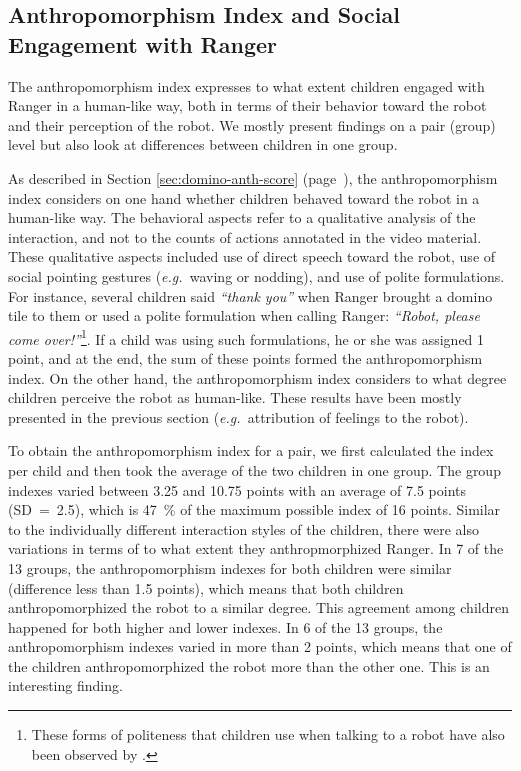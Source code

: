 \documentclass{sig-alternate}
\newcommand{\eg}{{\textit{e.g.~}}}
\begin{document}
\subsection{Anthropomorphism Index and Social Engagement with Ranger}

The anthropomorphism index expresses to what extent children engaged with Ranger
in a human-like way, both in terms of their behavior toward the robot and their
perception of the robot. We mostly present findings on a pair (group) level but
also look at differences between children in one group. 

As described in Section \ref{sec:domino-anth-score}
(page~\pageref{sec:domino-anth-score}), the anthropomorphism index considers on
one hand whether children behaved toward the robot in a human-like way. The
behavioral aspects refer to a qualitative analysis of the interaction, and not
to the counts of actions annotated in the video material. These qualitative
aspects included use of direct speech toward the robot, use of social pointing
gestures (\eg waving or nodding), and use of polite formulations. For instance,
several children said \textit{``thank you''} when Ranger brought a domino tile
to them or used a polite formulation when calling Ranger: \textit{``Robot,
please come over!''}\footnote{These forms of politeness that children use when
talking to a robot have also been observed by \cite{leite_long-term_2013}.}. If
a child was using such formulations, he or she was assigned 1 point, and at the
end, the sum of these points formed the anthropomorphism index. On the other
hand, the anthropomorphism index considers to what degree children perceive the
robot as human-like. These results have been mostly presented in the previous
section (\eg attribution of feelings to the robot). 

To obtain the anthropomorphism index for a pair, we first calculated the index
per child and then took the average of the two children in one group.  The group
indexes varied between 3.25 and 10.75 points with an average of 7.5 points
(SD~=~2.5), which is 47~\% of the maximum possible index of 16 points. Similar
to the individually different interaction styles of the children, there were
also variations in terms of to what extent they anthropmorphized Ranger. In 7 of
the 13 groups, the anthropomorphism indexes for both children were similar
(difference less than 1.5 points), which means that both children
anthropomorphized the robot to a similar degree. This agreement among children
happened for both higher and lower indexes. In 6 of the 13 groups, the
anthropomorphism indexes varied in more than 2 points, which means that one of
the children anthropomorphized the robot more than the other one. This is an
interesting finding.
\end{document}
